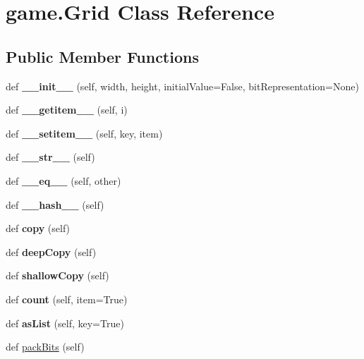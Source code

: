 \hypertarget{classgame_1_1_grid}{}\section{game.\+Grid Class Reference}
\label{classgame_1_1_grid}
\subsection*{Public Member Functions}
\begin{DoxyCompactItemize}
\item 
\mbox{\label{classgame_1_1_grid_a3b1b83ba30899fe0c032e4c0c54742b5}} 
def {\bfseries \+\_\+\+\_\+init\+\_\+\+\_\+} (self, width, height, initial\+Value=False, bit\+Representation=None)
\item 
\mbox{\label{classgame_1_1_grid_ab510e1e89123ae205d1650456531a61b}} 
def {\bfseries \+\_\+\+\_\+getitem\+\_\+\+\_\+} (self, i)
\item 
\mbox{\label{classgame_1_1_grid_a49d1ab55502c27cc282aedb477a1a9b1}} 
def {\bfseries \+\_\+\+\_\+setitem\+\_\+\+\_\+} (self, key, item)
\item 
\mbox{\label{classgame_1_1_grid_a9386299c8dbfc9b670ed524b61d394c1}} 
def {\bfseries \+\_\+\+\_\+str\+\_\+\+\_\+} (self)
\item 
\mbox{\label{classgame_1_1_grid_a130cb4e409a9e69c9925c324b3c3c943}} 
def {\bfseries \+\_\+\+\_\+eq\+\_\+\+\_\+} (self, other)
\item 
\mbox{\label{classgame_1_1_grid_a6c182310c465b15d37a5971216285a06}} 
def {\bfseries \+\_\+\+\_\+hash\+\_\+\+\_\+} (self)
\item 
\mbox{\label{classgame_1_1_grid_a23c3c93e0813bf12635de17581d385da}} 
def {\bfseries copy} (self)
\item 
\mbox{\label{classgame_1_1_grid_adcbc2f6d8ec7587b01df7aa2e060cb8d}} 
def {\bfseries deep\+Copy} (self)
\item 
\mbox{\label{classgame_1_1_grid_a1c2f255b295594d9fe01f6214ca3baec}} 
def {\bfseries shallow\+Copy} (self)
\item 
\mbox{\label{classgame_1_1_grid_a53de0c6dd98574c4e21aeb1df1a4c421}} 
def {\bfseries count} (self, item=True)
\item 
\mbox{\label{classgame_1_1_grid_a74e91d6f40cd3131c4c3541942cd45ba}} 
def {\bfseries as\+List} (self, key=True)
\item 
def \hyperlink{classgame_1_1_grid_a4cd22a6adb8a287be07ee4f09e623a2d}{pack\+Bits} (self)
\end{DoxyCompactItemize}

